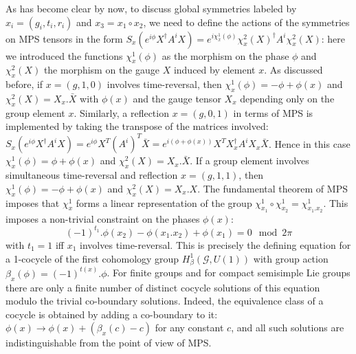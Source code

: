 \documentclass[rmp,aps,reprint,superscriptaddress,nobalancelastpage]{revtex4-1}
\begin{document}
As has become clear by now, to discuss global symmetries labeled by $x_i=(g_i,t_i,r_i)$ and $x_3=x_1\circ x_2$, we need to define the actions of the symmetries on MPS tensors in the form $S_x\left(e^{i\phi}X^\dagger A^i X\right)=e^{i\chi^1_x(\phi)}\chi^2_x(X)^\dagger A^i \chi^2_x(X)$:
here we introduced the functions $\chi^1_x(\phi)$ as the morphism on the phase $\phi$ and $\chi^2_x(X)$ the morphism on the gauge $X$ induced by element $x$.  As discussed before, if $x=(g,1,0)$ involves time-reversal, then $\chi^1_x(\phi)=-\phi+\phi(x)$ and $\chi^2_x(X)=X_x.\bar{X}$ with $\phi(x)$ and the gauge tensor $X_x$ depending only on the group element $x$. Similarly, a reflection $x=(g,0,1)$ in terms of MPS is implemented by taking the transpose of the matrices involved: $S_x\left(e^{i\phi}X^\dagger A^i X\right)=e^{i\phi}X^T (A^i)^T \bar{X}=e^{i(\phi+\phi(x))}X^T X_x^\dagger A^i X_x\bar{X}$. Hence in this case $\chi^1_x(\phi)=\phi+\phi(x)$ and $\chi^2_x(X)=X_x.\bar{X}$. If a group element involves simultaneous time-reversal and reflection $x=(g,1,1)$, then $\chi^1_x(\phi)=-\phi+\phi(x)$ and $\chi^2_x(X)=X_x.X$. The fundamental theorem of MPS imposes that $\chi^1_x$ forms a linear representation of the group $\chi^1_{x_1}\circ\chi^1_{x_2}=\chi^1_{x_1.x_2}$. This imposes a non-trivial constraint on the phases $\phi(x)$:
\[(-1)^{t_1}.\phi(x_2)-\phi(x_1.x_2)+\phi(x_1)=0\mod 2\pi\]
with $t_1=1$ iff $x_1$ involves time-reversal. This is precisely the defining equation for a 1-cocycle of the first cohomology group $H^1_\beta(\mathcal{G},U(1))$ with group action $\beta_{x}(\phi)=(-1)^{t(x)}.\phi$. For finite groups and for compact semisimple Lie groups there are only a finite number of distinct cocycle solutions of this equation modulo the trivial co-boundary solutions. Indeed, the equivalence class of a cocycle is obtained by adding a co-boundary to it: $\phi(x)\rightarrow \phi(x)+(\beta_x(c)-c)$ for any constant $c$, and all such solutions are indistinguishable from the point of view of MPS.
\end{document}
